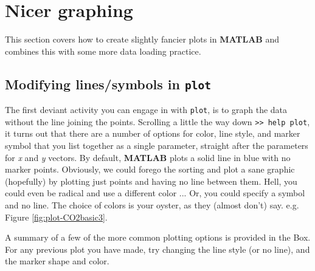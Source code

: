 \documentclass{tufte-book} %
\begin{document}
\newpage


\section{Nicer graphing}

This section covers how to create slightly fancier plots in \textbf{MATLAB} and combines this with some more data loading practice.


\subsection{Modifying lines/symbols in \texttt{plot}}

The first deviant activity you can engage in with \texttt{plot}, is to graph the data without the line joining the points. Scrolling a little the way down \texttt{>> help plot}, it turns out that there are a number of options for color, line style, and marker symbol that you list together as a single parameter, straight after the parameters for \textit{x} and \textit{y} vectors. By default, \textbf{MATLAB} plots a solid line in blue with no marker points. Obviously, we could forego the sorting and plot a sane graphic (hopefully) by plotting just points and having no line between them. Hell, you could even be radical and use a different color ... Or, you could specify a symbol and no line.  The choice of colors is your oyster, as they (almost don't) say. e.g. Figure \ref{fig:plot-CO2basic3}. 

A summary of a few of the more common plotting options is provided in the Box. For any previous plot you have made, try changing the line style (or no line), and the marker shape and color.
\end{document}
